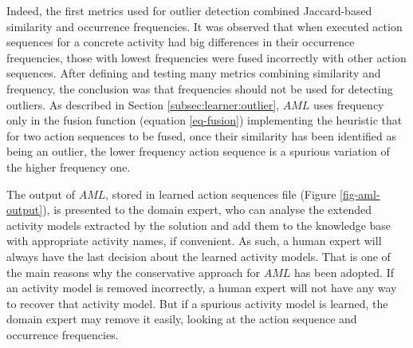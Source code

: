 Indeed, the first metrics used for outlier detection combined Jaccard-based similarity and occurrence frequencies. It was observed that when executed action sequences for a concrete activity had big differences in their occurrence frequencies, those with lowest frequencies were fused incorrectly with other action sequences. After defining and testing many metrics combining similarity and frequency, the conclusion was that frequencies should not be used for detecting outliers. As described in Section \ref{subsec:learner:outlier}, $AML$ uses frequency only in the fusion function (equation \ref{eq-fusion}) implementing the heuristic that for two action sequences to be fused, once their similarity has been identified as being an outlier, the lower frequency action sequence is a spurious variation of the higher frequency one. 

The output of $AML$, stored in learned action sequences file (Figure \ref{fig-aml-output}), is presented to the domain expert, who can analyse the extended activity models extracted by the solution and add them to the knowledge base with appropriate activity names, if convenient. As such, a human expert will always have the last decision about the learned activity models. That is one of the main reasons why the conservative approach for $AML$ has been adopted. If an activity model is removed incorrectly, a human expert will not have any way to recover that activity model. But if a spurious activity model is learned, the domain expert may remove it easily, looking at the action sequence and occurrence frequencies.